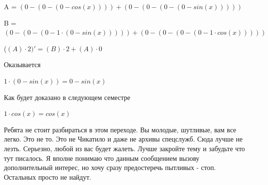 \documentclass[12pt,a4paper,fleqn]{article}
\begin{document}
\begin{center}
\begin{center}
\begin{center}
\begin{center}
\begin{center}
\begin{center}
\begin{center}
\begin{center}
\begin{center}
\begin{center}
\begin{center}
\begin{center}
\begin{center}
\begin{center}
\begin{center}
\begin{center}
\begin{center}
\begin{center}
\begin{center}
\begin{center}
\begin{center}
\begin{center}
\begin{center}
\begin{center}
\begin{center}
\begin{center}
\begin{center}
\begin{center}
\begin{center}
\begin{center}
\begin{center}
\begin{center}
\begin{center}
\begin{center}
\begin{center}
\begin{center}
\begin{center}
\begin{center}
\begin{center}
\begin{center}
\begin{center}
\begin{center}
\begin{center}
\begin{center}
\begin{center}
\begin{center}
\begin{center}
\begin{center}
\begin{center}
\begin{center}
\begin{center}
\begin{center}
\begin{center}
\begin{center}
\begin{center}
\begin{center}
\begin{center}
\begin{center}
\begin{center}
\begin{center}
\begin{center}
\begin{center}
\begin{center}
\begin{center}
\begin{center}
\begin{center}
\begin{center}
\begin{center}
A = $(0-(0-(0-cos(x))))+(0-(0-(0-(0-sin(x)))))$\end{center}
\begin{center}
B = $(0-(0-(0-1 \cdot (0-sin(x)))))+(0-(0-(0-(0-1 \cdot cos(x)))))$\end{center}
\begin{center}
 ($(A) \cdot 2)'
  = (B) \cdot 2+(A) \cdot 0$\end{center}
Оказывается

\begin{center}
$1 \cdot (0-sin(x)) = 0-sin(x)$\end{center}
Как будет доказано в следующем семестре

\begin{center}
$1 \cdot cos(x) = cos(x)$\end{center}
Ребята не стоит разбираться в этом переходе. Вы молодые, шутливые, вам все легко. Это не то. Это не Чикатило и даже не архивы спецслужб. Сюда лучше не лезть. Серьезно, любой из вас будет жалеть. Лучше закройте тему и забудьте что тут писалось. Я вполне понимаю что данным сообщением вызову дополнительный интерес, но хочу сразу предостеречь пытливых - стоп. Остальных просто не найдут.


\end{center}
\end{center}
\end{center}
\end{center}
\end{center}
\end{center}
\end{center}
\end{center}
\end{center}
\end{center}
\end{center}
\end{center}
\end{center}
\end{center}
\end{center}
\end{center}
\end{center}
\end{center}
\end{center}
\end{center}
\end{center}
\end{center}
\end{center}
\end{center}
\end{center}
\end{center}
\end{center}
\end{center}
\end{center}
\end{center}
\end{center}
\end{center}
\end{center}
\end{center}
\end{center}
\end{center}
\end{center}
\end{center}
\end{center}
\end{center}
\end{center}
\end{center}
\end{center}
\end{center}
\end{center}
\end{center}
\end{center}
\end{center}
\end{center}
\end{center}
\end{center}
\end{center}
\end{center}
\end{center}
\end{center}
\end{center}
\end{center}
\end{center}
\end{center}
\end{center}
\end{center}
\end{center}
\end{center}
\end{center}
\end{center}
\end{center}
\end{center}
\end{document}
